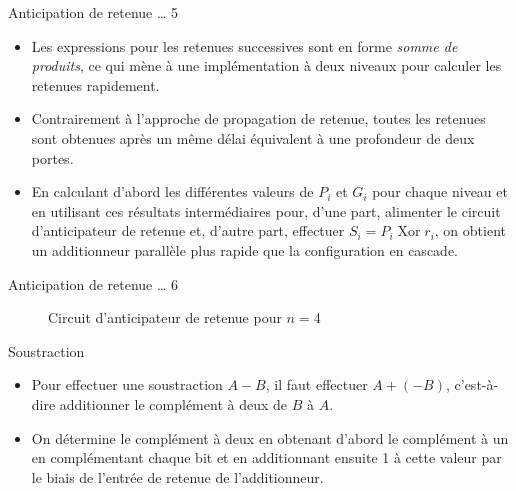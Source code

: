 \documentclass[presentation]{beamer}
\begin{document}
\begin{frame}[label={sec:org1f68a43}]{Anticipation de retenue \ldots{} 5}
\begin{itemize}
\item Les expressions pour les retenues successives sont en forme \emph{somme de produits}, ce qui mène à une implémentation à deux niveaux pour calculer les retenues rapidement.

\item Contrairement à l'approche de propagation de retenue, toutes les retenues sont obtenues après un même délai équivalent à une profondeur de deux portes.

\item En calculant d'abord les différentes valeurs de \(P_i\) et \(G_i\) pour chaque niveau et en utilisant ces résultats intermédiaires pour, d'une part, alimenter le circuit d'anticipateur de retenue et, d'autre part, effectuer \(S_i = P_i \operatorname{Xor} r_i\), on obtient un additionneur parallèle plus rapide que la configuration en cascade.
\end{itemize}
\end{frame}

\begin{frame}[label={sec:org907b825}]{Anticipation de retenue \ldots{} 6}
\begin{figure}[htbp]
\centering

\caption{\label{fig:orga63d756}Circuit d'anticipateur de retenue pour \(n= 4\)}
\end{figure}
\end{frame}


\begin{frame}[label={sec:org58c7c9e}]{Soustraction}
\begin{itemize}
\item Pour effectuer une soustraction \(A - B\), il faut effectuer \(A + (-B)\), c'est-à-dire additionner le complément à deux de \(B\) à \(A\).

\item On détermine le complément à deux en obtenant d'abord le complément à un en complémentant chaque bit et en additionnant ensuite 1 à cette valeur par le biais de l'entrée de retenue de l'additionneur.
\end{itemize}
\end{frame}
\end{document}

